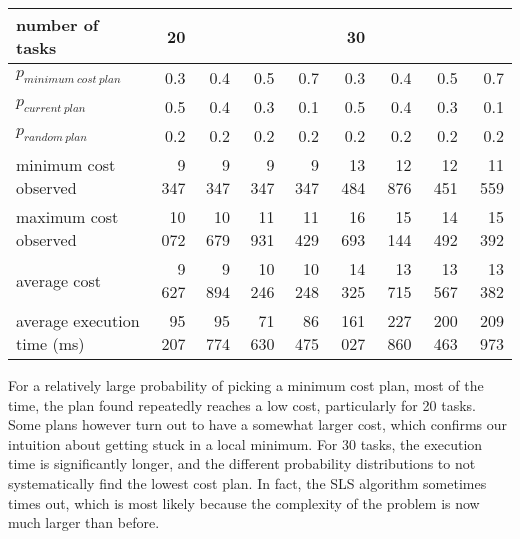 \documentclass[10pt]{article}
\begin{document}
\begin{tabular}{|l|rrrr|rrrr|}
\hline
number of tasks & 20 & & & & 30 & & & \\
\hline
$p_{minimum\ cost\ plan}$ & 0.3 & 0.4 & 0.5 & 0.7 & 0.3 & 0.4 & 0.5 & 0.7\\
$p_{current\ plan}$       & 0.5 & 0.4 & 0.3 & 0.1 & 0.5 & 0.4 & 0.3 & 0.1\\
$p_{random\ plan}$        & 0.2 & 0.2 & 0.2 & 0.2 & 0.2 & 0.2 & 0.2 & 0.2\\
\hline
minimum cost observed &  9 347 &  9 347 &  9 347 &  9 347 & 13 484 & 12 876 & 12 451 & 11 559\\
maximum cost observed & 10 072 & 10 679 & 11 931 & 11 429 & 16 693 & 15 144 & 14 492 & 15 392\\
\hline
average cost                &  9 627 &  9 894 & 10 246 & 10 248 &  14 325 &  13 715 &  13 567 & 13 382\\
average execution time (ms) & 95 207 & 95 774 & 71 630 & 86 475 & 161 027 & 227 860 & 200 463 & 209 973\\
\hline
\end{tabular}
\label{table:model_parameters}
\vspace{4mm}
For a relatively large probability of picking a minimum cost plan, most of the time, the plan found repeatedly reaches a low cost, particularly for 20 tasks. Some plans however turn out to have a somewhat larger cost, which confirms our intuition about getting stuck in a local minimum. 
For 30 tasks, the execution time is significantly longer, and the different probability distributions to not systematically find the lowest cost plan. In fact, the SLS algorithm sometimes times out, which is most likely because the complexity of the problem is now much larger than before.

\end{document}
